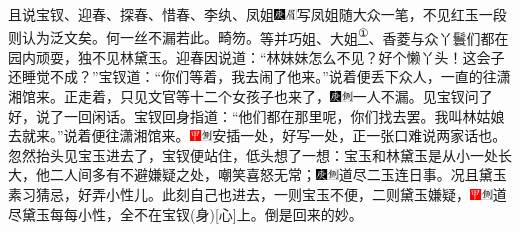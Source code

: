 且说宝钗、迎春、探春、惜春、李纨、凤姐{\includegraphics[width=3mm]{../Images/00004}\includegraphics[width=3mm]{../Images/00010}\footnotesize \kaishu 写凤姐随大众一笔，不见红玉一段则认为泛文矣。何一丝不漏若此。畸笏。}等并巧姐、大姐\href{../Text/part0031_split_000.html\#lnkback_1_a}{\textsuperscript{①}}、香菱与众丫鬟们都在园内顽耍，独不见林黛玉。迎春因说道：``林妹妹怎么不见？好个懒丫头！这会子还睡觉不成？''宝钗道：``你们等着，我去闹了他来。''说着便丢下众人，一直的往潇湘馆来。正走着，只见文官等十二个女孩子也来了，{\includegraphics[width=3mm]{../Images/00004}\includegraphics[width=3mm]{../Images/00011}\footnotesize \kaishu 一人不漏。}见宝钗问了好，说了一回闲话。宝钗回身指道：``他们都在那里呢，你们找去罢。我叫林姑娘去就来。''说着便往潇湘馆来。{\includegraphics[width=3mm]{../Images/00002}\includegraphics[width=3mm]{../Images/00011}\footnotesize \kaishu 安插一处，好写一处，正一张口难说两家话也。}忽然抬头见宝玉进去了，宝钗便站住，低头想了一想：宝玉和林黛玉是从小一处长大，他二人间多有不避嫌疑之处，嘲笑喜怒无常；{\includegraphics[width=3mm]{../Images/00004}\includegraphics[width=3mm]{../Images/00011}\footnotesize \kaishu 道尽二玉连日事。}况且黛玉素习猜忌，好弄小性儿。此刻自己也进去，一则宝玉不便，二则黛玉嫌疑，{{\includegraphics[width=3mm]{../Images/00002}\includegraphics[width=3mm]{../Images/00011}\footnotesize \kaishu 道尽黛玉每每小性，全不在宝钗{(身)}{[}心{]}上。}}倒是回来的妙。

